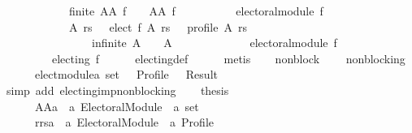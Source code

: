 \begin{isabellebody}
\ \ \ \ \ \ \ \ \ \ \ \ finite\ {\isacharparenleft}{\kern0pt}AA\ f{\isacharparenright}{\kern0pt}\ {\isasymand}\ {\isacharbraceleft}{\kern0pt}{\isacharbraceright}{\kern0pt}\ {\isasymnoteq}\ AA\ f\ {\isasymor}\isanewline
\ \ \ \ \ \ \ \ {\isasymnot}\ electoral{\isacharunderscore}{\kern0pt}module\ f{\isacharparenright}{\kern0pt}\ {\isasymand}\isanewline
\ \ \ \ \ \ \ \ \ \ \ \ {\isacharparenleft}{\kern0pt}{\isacharparenleft}{\kern0pt}{\isasymforall}A\ rs{\isachardot}{\kern0pt}\ {\isacharbraceleft}{\kern0pt}{\isacharbraceright}{\kern0pt}\ {\isasymnoteq}\ elect\ f\ A\ rs\ {\isasymor}\ {\isasymnot}\ profile\ A\ rs\ {\isasymor}\isanewline
\ \ \ \ \ \ \ \ \ \ \ \ \ \ \ \ infinite\ A\ {\isasymor}\ {\isacharbraceleft}{\kern0pt}{\isacharbraceright}{\kern0pt}\ {\isacharequal}{\kern0pt}\ A{\isacharparenright}{\kern0pt}\ {\isasymand}\isanewline
\ \ \ \ \ \ \ \ \ \ \ \ electoral{\isacharunderscore}{\kern0pt}module\ f\ {\isasymor}\isanewline
\ \ \ \ \ \ \ \ {\isasymnot}\ electing\ f{\isacharparenright}{\kern0pt}{\isachardoublequoteclose}\isanewline
\ \ \ \ \isamarkupfalse%
\ electing{\isacharunderscore}{\kern0pt}def\isanewline
\ \ \ \ \isamarkupfalse%
\ metis\isanewline
\ \ \isamarkupfalse%
\ non{\isacharunderscore}{\kern0pt}block{\isacharcolon}{\kern0pt}\isanewline
\ \ \ \ {\isachardoublequoteopen}non{\isacharunderscore}{\kern0pt}blocking\isanewline
\ \ \ \ \ \ {\isacharparenleft}{\kern0pt}elect{\isacharunderscore}{\kern0pt}module{\isacharcolon}{\kern0pt}{\isacharcolon}{\kern0pt}{\isacharprime}{\kern0pt}a\ set\ {\isasymRightarrow}\ {\isacharunderscore}{\kern0pt}\ Profile\ {\isasymRightarrow}\ {\isacharunderscore}{\kern0pt}\ Result{\isacharparenright}{\kern0pt}{\isachardoublequoteclose}\isanewline
\ \ \ \ \isamarkupfalse%
\ {\isacharparenleft}{\kern0pt}simp\ add{\isacharcolon}{\kern0pt}\ electing{\isacharunderscore}{\kern0pt}imp{\isacharunderscore}{\kern0pt}non{\isacharunderscore}{\kern0pt}blocking{\isacharparenright}{\kern0pt}\isanewline
\ \ \isamarkupfalse%
\ {\isacharquery}{\kern0pt}thesis\isanewline
\ \ \ \ \isanewline
\ \ \isamarkupfalse%
\ {\isacharminus}{\kern0pt}\isanewline
\ \ \ \ \isamarkupfalse%
\isanewline
\ \ \ \ \ \ AAa\ {\isacharcolon}{\kern0pt}{\isacharcolon}{\kern0pt}\ {\isachardoublequoteopen}{\isacharprime}{\kern0pt}a\ Electoral{\isacharunderscore}{\kern0pt}Module\ {\isasymRightarrow}\ {\isacharprime}{\kern0pt}a\ set{\isachardoublequoteclose}\ \isanewline
\ \ \ \ \ \ rrsa\ {\isacharcolon}{\kern0pt}{\isacharcolon}{\kern0pt}\ {\isachardoublequoteopen}{\isacharprime}{\kern0pt}a\ Electoral{\isacharunderscore}{\kern0pt}Module\ {\isasymRightarrow}\ {\isacharprime}{\kern0pt}a\ Profile{\isachardoublequoteclose}\ \isanewline

\end{isabellebody}
